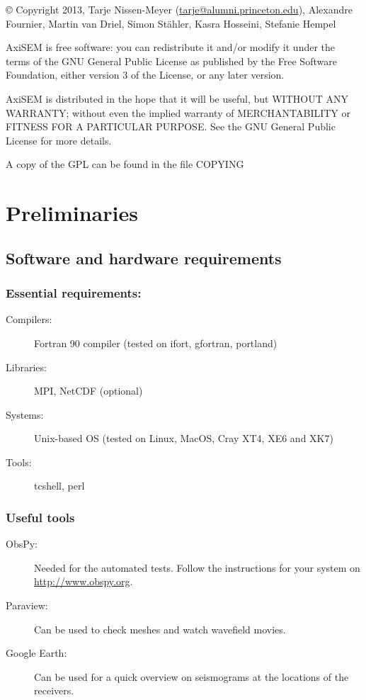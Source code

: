 \documentclass[11pt,letter,fleqn,english,notitlepage]{article}
\begin{document}
\noindent \copyright  \hspace*{0.1cm} 
Copyright 2013, Tarje Nissen-Meyer (\url{tarje@alumni.princeton.edu}), Alexandre Fournier, Martin van Driel, Simon Stähler, Kasra Hosseini, Stefanie Hempel

AxiSEM is free software: you can redistribute it and/or modify it under the terms of the GNU General Public License as published by the Free Software Foundation, either version 3 of the License, or any later version.

AxiSEM is distributed in the hope that it will be useful, but WITHOUT ANY WARRANTY; without even the implied warranty of MERCHANTABILITY or FITNESS FOR A PARTICULAR PURPOSE.  See the GNU General Public License for more details.

A copy of the GPL can be found in the file COPYING

\newpage
\tableofcontents
\newpage

\section{Preliminaries}

\subsection{Software and hardware requirements}

\subsubsection{Essential requirements:} 
\begin{description}
 \item[Compilers:] Fortran 90 compiler (tested on ifort, gfortran, portland)
 \item[Libraries:] MPI, NetCDF (optional)
 \item[Systems:] Unix-based OS (tested on Linux, MacOS, Cray XT4, XE6 and XK7)
 \item[Tools:] tcshell, perl
\end{description}
\subsubsection{Useful tools}
\begin{description}
 \item[ObsPy:] Needed for the automated tests. Follow the instructions for your system on \url{http://www.obspy.org}.
 \item[Paraview:] Can be used to check meshes and watch wavefield movies.
 \item[Google Earth:] Can be used for a quick overview on seismograms at the locations of the receivers.
\end{description}
\end{document}
